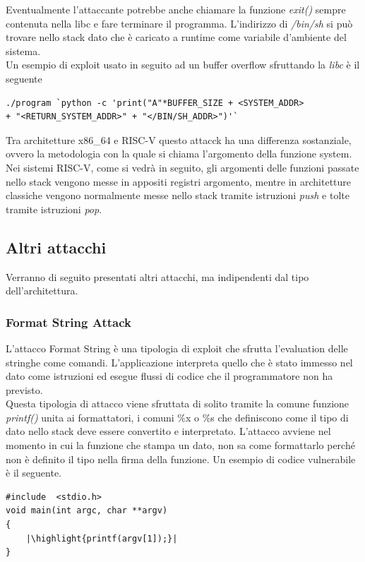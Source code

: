 Eventualmente l'attaccante potrebbe anche chiamare la funzione \textit{exit()} sempre contenuta nella libc e fare terminare il programma. L'indirizzo di \textit{/bin/sh} si può trovare nello stack dato che è caricato a runtime come variabile d'ambiente del sistema.\\
Un esempio di exploit usato in seguito ad un buffer overflow sfruttando la \textit{libc} è il seguente
\begin{verbatim}
./program `python -c 'print("A"*BUFFER_SIZE + <SYSTEM_ADDR> 
+ "<RETURN_SYSTEM_ADDR>" + "</BIN/SH_ADDR>")'`
\end{verbatim}
Tra architetture x86\_64 e RISC-V questo attacck ha una differenza sostanziale, ovvero la metodologia con la quale si chiama l'argomento della funzione system. Nei sistemi RISC-V, come si vedrà in seguito, gli argomenti delle funzioni passate nello stack vengono messe in appositi registri argomento, mentre in architetture classiche vengono normalmente messe nello stack tramite istruzioni \textit{push} e tolte tramite istruzioni \textit{pop}.
\subsection*{Altri attacchi}
Verranno di seguito presentati altri attacchi, ma indipendenti dal tipo dell'architettura.
\subsubsection{Format String Attack}
L'attacco Format String \cite{OwaspFormatString} è una tipologia di exploit che sfrutta l'evaluation delle stringhe come comandi. L'applicazione interpreta quello che è stato immesso nel dato come istruzioni ed esegue flussi di codice che il programmatore non ha previsto. \\
\newline
Questa tipologia di attacco viene sfruttata di solito tramite la  comune funzione \textit{printf()} unita ai formattatori, i comuni  \%x o \%s che definiscono come il tipo di dato nello stack deve essere convertito e interpretato. L'attacco avviene nel momento in cui la funzione che stampa un dato, non sa come formattarlo perché non è definito il tipo nella firma della funzione. Un esempio di codice vulnerabile è il seguente.

\begin{verbatim}
#include  <stdio.h> 
void main(int argc, char **argv)
{
    |\highlight{printf(argv[1]);}|
}  
\end{verbatim}

